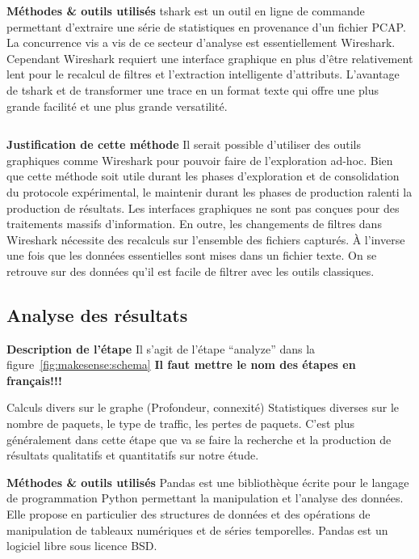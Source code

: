 \textbf{Méthodes \& outils utilisés} tshark \cite{tshark} est un outil en
ligne de commande permettant d'extraire une série de statistiques en
provenance d'un fichier \ac{PCAP}. La concurrence vis a vis de ce secteur
d'analyse est essentiellement Wireshark. Cependant Wireshark requiert une
interface graphique en plus d'être relativement lent pour le recalcul de
filtres et l'extraction intelligente d'attributs. L'avantage de tshark et de
transformer une trace en un format texte qui offre une plus grande facilité et
une plus grande versatilité.

\inputminted{python}{snippets/parsing.py}

\textbf{Justification de cette méthode} Il serait possible d'utiliser des
outils graphiques comme Wireshark pour pouvoir faire de l'exploration ad-hoc.
Bien que cette méthode soit utile durant les phases d'exploration et de
consolidation du protocole expérimental, le maintenir durant les phases de
production ralenti la production de résultats. Les interfaces graphiques ne
sont pas conçues pour des traitements massifs d'information. En outre, les
changements de filtres dans Wireshark nécessite des recalculs sur l'ensemble
des fichiers capturés. À l'inverse une fois que les données essentielles sont
mises dans un fichier texte. On se retrouve sur des données qu'il est facile
de filtrer avec les outils classiques.

\subsection{Analyse des résultats}

\textbf{Description de l'étape}  Il s'agit de  l'étape ``analyze''  dans la
figure~\ref{fig:makesense:schema}
\textbf{Il faut mettre le nom des étapes en français!!!}

Calculs divers sur le graphe (Profondeur,
connexité) Statistiques diverses sur le nombre de paquets, le type de traffic,
les pertes de paquets. C'est plus généralement dans cette étape que va se
faire la recherche et la production de résultats qualitatifs et quantitatifs
sur notre étude.

\textbf{Méthodes \& outils utilisés} Pandas \cite{mckinney-proc-scipy-2010}
est une bibliothèque écrite pour le langage de programmation Python permettant
la  manipulation et l'analyse des données. Elle propose en particulier des
structures de données et des opérations de  manipulation de tableaux
numériques et de séries temporelles. Pandas est un logiciel libre sous licence
BSD.


